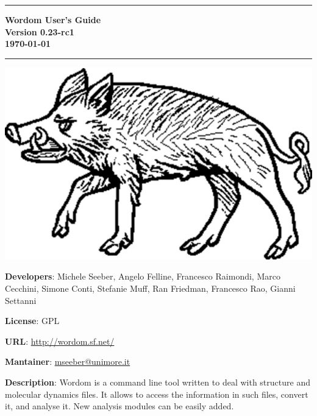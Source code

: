 \documentclass[11pt,twoside,onecolumn,a4paper,openright,notitlepage]{book}[2001/04/21]
\begin{document}

\begin{titlepage}
\begin{center}
\rule[1cm]{15cm}{0.05cm}
\bfseries {\huge Wordom User's Guide}\\ \vspace{0.4cm}
          {\large Version 0.23-rc1}\\ \vspace{0.2cm}
          {\large \today}
\rule[-0.5cm]{15cm}{0.051cm}

\vspace{2.25cm}
\includegraphics[scale=0.75]{images/wlogo.pdf}
\end{center}
\vspace{2.25cm}
%
\noindent\textbf{\large Developers}: Michele Seeber, Angelo Felline, Francesco Raimondi, Marco Cecchini, Simone Conti, Stefanie Muff, Ran Friedman, Francesco Rao, Gianni Settanni
\vspace{0.3cm}

\noindent\textbf{\large License}: GPL
\vspace{0.3cm}

\noindent\textbf{\large URL}: \url{http://wordom.sf.net/}
\vspace{0.3cm}

\noindent\textbf{\large Mantainer}: \href{mailto:mseeber@unimore.it}{mseeber@unimore.it}
\vspace{0.3cm}

\noindent\textbf{\large Description}: Wordom is a command line tool written to deal with structure and molecular dynamics files. It allows to access the information in such files, convert it, and analyse it. New analysis modules can be easily added.
\end{titlepage}
\thispagestyle{plain}
\cleardoublepage
\end{document}

